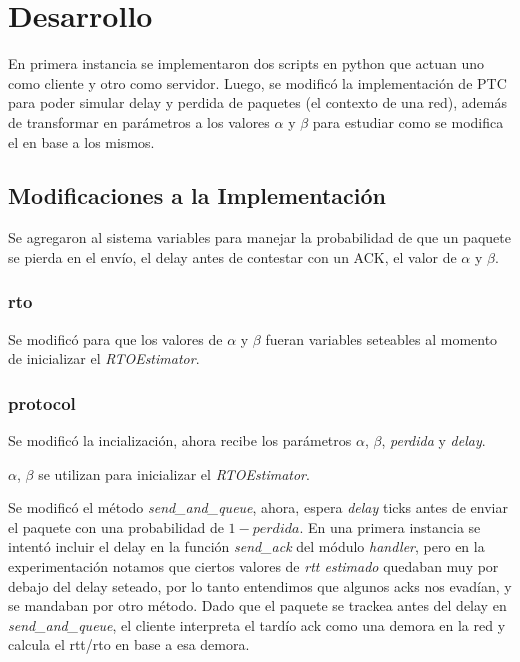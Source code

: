 \section{Desarrollo}

    En primera instancia se implementaron dos scripts en python que 
    actuan uno como cliente y otro como servidor.
    Luego, se modific\'o la implementaci\'on de PTC para poder simular
    delay y perdida de paquetes (el contexto de una red), adem\'as de transformar en par\'ametros
    a los valores $\alpha$ y $\beta$ para estudiar como se modifica el
    \rto{} en base a los mismos.  

  \subsection{Modificaciones a la Implementaci\'on}
    Se agregaron al sistema variables para manejar la probabilidad de que 
    un paquete se pierda en el env\'io, el delay antes de contestar con 
    un ACK, el valor de $\alpha$ y $\beta$.

    \subsubsection{rto}
    Se modific\'o para que los valores de $\alpha$ y $\beta$ fueran 
    variables seteables al momento de inicializar el \textit{RTOEstimator}.
    
    \subsubsection{protocol}
    Se modific\'o la incializaci\'on, ahora recibe los par\'ametros 
    $\alpha$, $\beta$, \textit{perdida} y \textit{delay}.
    
    $\alpha$, $\beta$ se utilizan para inicializar el \textit{RTOEstimator}.
    
    Se modific\'o el m\'etodo \textit{send\_and\_queue}, ahora, espera 
    \textit{delay} ticks antes de enviar el paquete con una probabilidad
    de $1-perdida$. En una primera instancia se intent\'o incluir el delay
    en la funci\'on \textit{send\_ack} del m\'odulo \textit{handler}, pero
    en la experimentaci\'on notamos que ciertos valores de \textit{rtt estimado}
    quedaban muy por debajo del delay seteado, por lo tanto entendimos que 
    algunos acks nos evad\'ian, y se mandaban por otro m\'etodo. 
    Dado que el paquete se trackea antes del delay en \textit{send\_and\_queue},
    el cliente interpreta el tard\'io ack como una demora en la red y calcula el 
    rtt/rto en base a esa demora.

